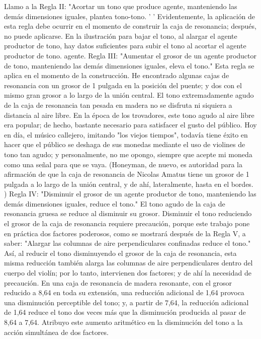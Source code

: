 Llamo a la Regla II: "Acortar un tono que produce
agente, manteniendo las demás dimensiones iguales, plantea
tono-tono. ' ' Evidentemente, la aplicación de esta regla debe ocurrir en el momento de construir la caja de resonancia; después, no puede aplicarse. En la ilustración para bajar el tono, al alargar el agente productor de tono, hay datos suficientes para subir el tono al acortar el agente productor de tono.
agente.
Regla III: "Aumentar el grosor de un agente productor de tono, manteniendo las demás dimensiones iguales, eleva el tono." Esta regla se aplica en el momento de la construcción. He encontrado algunas cajas de resonancia con un grosor de 1 pulgada en la posición del puente; y dos con el mismo gran grosor a lo largo de la unión central. El tono extremadamente agudo de la caja de resonancia tan pesada en madera no se disfruta ni siquiera a distancia al aire libre. En la época de los trovadores, este tono agudo al aire libre era popular; de hecho, bastante necesario para satisfacer el gusto del público. Hoy en día, el músico callejero, imitando "los viejos tiempos", todavía tiene éxito en hacer que el público se deshaga de sus monedas mediante el uso de violines de tono tan agudo; y personalmente, no me opongo, siempre que acepte mi moneda como una señal para que se vaya. (Honeyman, de nuevo, es autoridad para la afirmación de que la caja de resonancia de Nicolas Amatus tiene un grosor de 1 pulgada a lo largo de la unión central, y de ahí, lateralmente, hasta en el bordes. )
Regla IV: "Disminuir el grosor de un agente productor de tono, manteniendo las demás dimensiones iguales, reduce el tono." El tono agudo de la caja de resonancia gruesa se reduce al disminuir
su grosor. Disminuir el tono reduciendo el grosor de la caja de resonancia requiere precaución, porque este trabajo pone en práctica dos factores poderosos, como se mostrará después de la Regla V, a saber:
"Alargar las columnas de aire perpendiculares confinadas reduce el tono." Así, al reducir el tono disminuyendo el grosor de la caja de resonancia, esta misma reducción también alarga las columnas de aire perpendiculares dentro del cuerpo del violín; por lo tanto, intervienen dos factores; y de ahí la necesidad de precaución. En una caja de resonancia de madera resonante, con el grosor reducido a 8,64 en toda su extensión, una reducción adicional de 1,64 provoca una disminución perceptible del tono; y, a partir de 7,64, la reducción adicional de 1,64 reduce el tono dos veces más que la disminución producida al pasar de 8,64 a 7,64. Atribuyo este aumento aritmético en la disminución del tono a la acción simultánea de dos factores.
